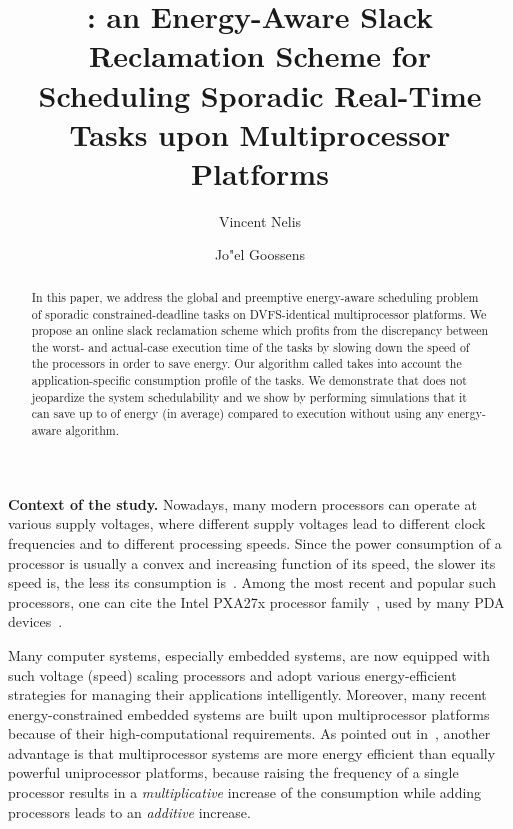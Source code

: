 \documentclass[times, 10pt,twocolumn]{article}
\title{: an Energy-Aware Slack Reclamation Scheme for \\ Scheduling Sporadic Real-Time Tasks upon Multiprocessor Platforms}
\author{Vincent Nelis \and Jo\a"el Goossens}
\begin{document}
\maketitle
{}
\addtocounter{footnote}{1}
\addtocounter{footnote}{1}

\begin{abstract}
In this paper, we address the global and preemptive energy-aware scheduling problem of sporadic constrained-deadline tasks on DVFS-identical multiprocessor platforms. We propose an online slack reclamation scheme which profits from the discrepancy between the worst- and actual-case execution time of the tasks by slowing down the speed of the processors in order to save energy. Our algorithm called  takes into account the application-specific consumption profile of the tasks. We demonstrate that  does not jeopardize the system schedulability and we show by performing simulations that it can save up to  of energy (in average) compared to execution without using any energy-aware algorithm. 
\end{abstract}


\textbf{Context of the study.} Nowadays, many modern processors can operate at various supply voltages, where different supply voltages lead to different clock frequencies and to different processing speeds. Since the power consumption of a processor is usually a convex and increasing function of its speed, the slower its speed is, the less its consumption is~\cite{Kuo:06}. Among the most recent and popular such processors, one can cite the Intel PXA27x processor family~\cite{IntelDatasheet:05}, used by many PDA devices~\cite{UrlDevice}. 

Many computer systems, especially embedded systems, are now equipped with such voltage (speed) scaling processors and adopt various energy-efficient strategies for managing their applications intelligently. Moreover, many recent energy-constrained embedded systems are built upon multiprocessor platforms because of their high-computational requirements. As pointed out in~\cite{BaAn:03,AndersonBaruah:04}, another advantage is that multiprocessor systems are more energy efficient than equally powerful uniprocessor platforms, because raising the frequency of a single processor results in a \emph{multiplicative} increase of the consumption while adding processors leads to an \emph{additive} increase. 
\end{document}
